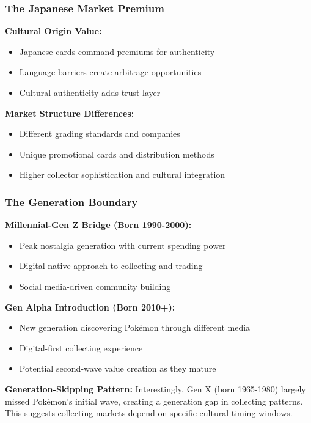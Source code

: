 \documentclass[11pt,oneside]{book}
\begin{document}
{{{{{{\subsubsection{The Japanese Market Premium}

\textbf{Cultural Origin Value:}
\begin{itemize}
\item Japanese cards command premiums for authenticity
\item Language barriers create arbitrage opportunities
\item Cultural authenticity adds trust layer
\end{itemize}

\textbf{Market Structure Differences:}
\begin{itemize}
\item Different grading standards and companies
\item Unique promotional cards and distribution methods
\item Higher collector sophistication and cultural integration
\end{itemize}

\subsubsection{The Generation Boundary}

\textbf{Millennial-Gen Z Bridge (Born 1990-2000):}
\begin{itemize}
\item Peak nostalgia generation with current spending power
\item Digital-native approach to collecting and trading
\item Social media-driven community building
\end{itemize}

\textbf{Gen Alpha Introduction (Born 2010+):}
\begin{itemize}
\item New generation discovering Pokémon through different media
\item Digital-first collecting experience
\item Potential second-wave value creation as they mature
\end{itemize}

\textbf{Generation-Skipping Pattern:}
Interestingly, Gen X (born 1965-1980) largely missed Pokémon's initial wave, creating a generation gap in collecting patterns. This suggests collecting markets depend on specific cultural timing windows.

}}}}}}
\end{document}
